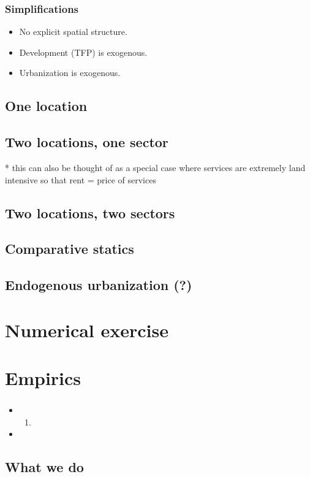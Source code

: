 \documentclass[compress,mathserif]{beamer}
\newcounter{perc}
\newcounter{percek}
\begin{document}
\begin{frame}\frametitle{Simplifications}
\begin{itemize}
    \item No explicit spatial structure.
    \item Development (TFP) is exogenous.
    \item Urbanization is exogenous.
\end{itemize}
\end{frame}

\subsection{One location}
\subsection{Two locations, one sector}
* this can also be thought of as a special case where services are extremely land intensive so that rent = price of services
\subsection{Two locations, two sectors}
\subsection{Comparative statics}
\subsection{Endogenous urbanization (?)}
\section{Numerical exercise}
\section{Empirics}

\begin{frame}\frametitle{}

\begin{itemize}[<+->]
    \item
    \begin{enumerate}[<+->]
        \item
    \end{enumerate}
    \item
\end{itemize}
\end{frame}




\addtocounter{percek}{9}

\subsection{What we do}
\end{document}
